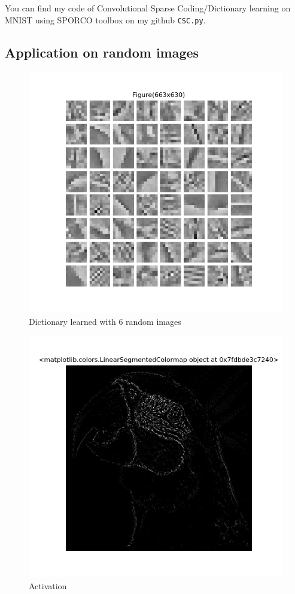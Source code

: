 \documentclass[a4paper,10pt]{article}
\begin{document}
You can find my code of Convolutional Sparse Coding/Dictionary learning on MNIST using SPORCO toolbox on my github \texttt{CSC.py}.\\

\newpage
\subsection{Application on random images}
\begin{figure}[h]
 \centering
 \includegraphics[scale=0.6]{Results/SPORCO_test_img/Figure_2.png}
 \caption{Dictionary learned with 6 random images}
\end{figure}
\begin{figure}[h]
 \centering
 \includegraphics[scale=0.45]{Results/SPORCO_test_img/activations.png}
 \caption{Activation}
\end{figure}
\end{document}
